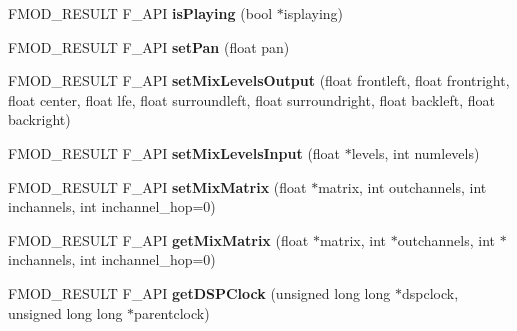 \begin{DoxyCompactItemize}
\item 
\hypertarget{class_f_m_o_d_1_1_channel_control_a015a66e7e735b8043cf431eef7bd08ec}{F\+M\+O\+D\+\_\+\+R\+E\+S\+U\+L\+T F\+\_\+\+A\+P\+I {\bfseries is\+Playing} (bool $\ast$isplaying)}\label{class_f_m_o_d_1_1_channel_control_a015a66e7e735b8043cf431eef7bd08ec}

\item 
\hypertarget{class_f_m_o_d_1_1_channel_control_a1291d831432f360a41fb0b92006a04ca}{F\+M\+O\+D\+\_\+\+R\+E\+S\+U\+L\+T F\+\_\+\+A\+P\+I {\bfseries set\+Pan} (float pan)}\label{class_f_m_o_d_1_1_channel_control_a1291d831432f360a41fb0b92006a04ca}

\item 
\hypertarget{class_f_m_o_d_1_1_channel_control_a8115b7a7663c09a7ba61df05447415c3}{F\+M\+O\+D\+\_\+\+R\+E\+S\+U\+L\+T F\+\_\+\+A\+P\+I {\bfseries set\+Mix\+Levels\+Output} (float frontleft, float frontright, float center, float lfe, float surroundleft, float surroundright, float backleft, float backright)}\label{class_f_m_o_d_1_1_channel_control_a8115b7a7663c09a7ba61df05447415c3}

\item 
\hypertarget{class_f_m_o_d_1_1_channel_control_a571656bedf6f122615436666005accae}{F\+M\+O\+D\+\_\+\+R\+E\+S\+U\+L\+T F\+\_\+\+A\+P\+I {\bfseries set\+Mix\+Levels\+Input} (float $\ast$levels, int numlevels)}\label{class_f_m_o_d_1_1_channel_control_a571656bedf6f122615436666005accae}

\item 
\hypertarget{class_f_m_o_d_1_1_channel_control_aa88ea962affd54cda96e37fd3a7e2f5a}{F\+M\+O\+D\+\_\+\+R\+E\+S\+U\+L\+T F\+\_\+\+A\+P\+I {\bfseries set\+Mix\+Matrix} (float $\ast$matrix, int outchannels, int inchannels, int inchannel\+\_\+hop=0)}\label{class_f_m_o_d_1_1_channel_control_aa88ea962affd54cda96e37fd3a7e2f5a}

\item 
\hypertarget{class_f_m_o_d_1_1_channel_control_ab24ab6339a35f3028f4fb6e6fd5c134f}{F\+M\+O\+D\+\_\+\+R\+E\+S\+U\+L\+T F\+\_\+\+A\+P\+I {\bfseries get\+Mix\+Matrix} (float $\ast$matrix, int $\ast$outchannels, int $\ast$inchannels, int inchannel\+\_\+hop=0)}\label{class_f_m_o_d_1_1_channel_control_ab24ab6339a35f3028f4fb6e6fd5c134f}

\item 
\hypertarget{class_f_m_o_d_1_1_channel_control_abcfbd62a35db285c30e02299469777fc}{F\+M\+O\+D\+\_\+\+R\+E\+S\+U\+L\+T F\+\_\+\+A\+P\+I {\bfseries get\+D\+S\+P\+Clock} (unsigned long long $\ast$dspclock, unsigned long long $\ast$parentclock)}\label{class_f_m_o_d_1_1_channel_control_abcfbd62a35db285c30e02299469777fc}


\end{DoxyCompactItemize}
